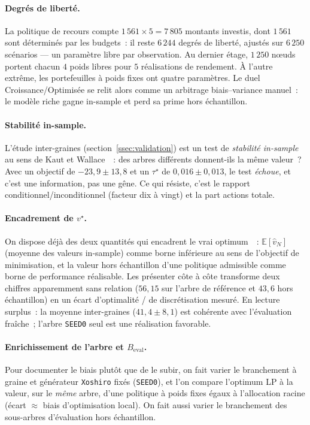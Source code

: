 \documentclass[11pt,letterpaper]{article}
\newcommand{\E}{\mathbb{E}}
\newcommand{\taustar}{\tau^{\star}}
\theoremstyle{definition}
\begin{document}
\paragraph{Degrés de liberté.}
La politique de recours compte $1\,561 \times 5 = 7\,805$ montants investis,
dont $1\,561$ sont déterminés par les budgets~: il reste $6\,244$ degrés de
liberté, ajustés sur $6\,250$ scénarios --- un paramètre libre par
observation. Au dernier étage, $1\,250$ n\oe uds portent chacun $4$ poids
libres pour $5$ réalisations de rendement. À l'autre extrême, les portefeuilles
à poids fixes ont quatre paramètres. Le duel Croissance/Optimisée se relit
alors comme un arbitrage biais--variance manuel~: le modèle riche gagne
in-sample et perd sa prime hors échantillon.

\paragraph{Stabilité in-sample.}
L'étude inter-graines (section~\ref{ssec:validation}) est un test de
\emph{stabilité in-sample} au sens de Kaut et Wallace~\cite{KautWallace2007}~:
des arbres différents donnent-ils la même valeur~? Avec un objectif de
$-23{,}9 \pm 13{,}8$ et un $\taustar$ de $0{,}016 \pm 0{,}013$, le test
\emph{échoue}, et c'est une information, pas une gêne. Ce qui résiste, c'est le
rapport conditionnel/inconditionnel (facteur dix à vingt) et la part actions
totale.

\paragraph{Encadrement de $v^\star$.}
On dispose déjà des deux quantités qui encadrent le vrai optimum~\cite{Mak1999}~:
$\E[\hat v_N]$ (moyenne des valeurs in-sample) comme borne inférieure au sens
de l'objectif de minimisation, et la valeur hors échantillon d'une politique
admissible comme borne de performance réalisable. Les présenter côte à côte
transforme deux chiffres apparemment sans relation ($56{,}15$ sur l'arbre de
référence et $43{,}6$ hors échantillon) en un écart d'optimalité / de
discrétisation mesuré. En lecture surplus~: la moyenne inter-graines
($41{,}4 \pm 8{,}1$) est cohérente avec l'évaluation fraîche~; l'arbre
\texttt{SEED0} seul est une réalisation favorable.

\paragraph{Enrichissement de l'arbre et $B_{\mathrm{eval}}$.}
\label{par:enrichissement}
Pour documenter le biais plutôt que de le subir, on fait varier le branchement
à graine et générateur \texttt{Xoshiro} fixés (\texttt{SEED0}), et l'on compare
l'optimum LP à la valeur, sur le \emph{même} arbre, d'une politique à poids
fixes égaux à l'allocation racine (écart $\approx$ biais d'optimisation
local). On fait aussi varier le branchement des sous-arbres d'évaluation hors
échantillon.
\end{document}
